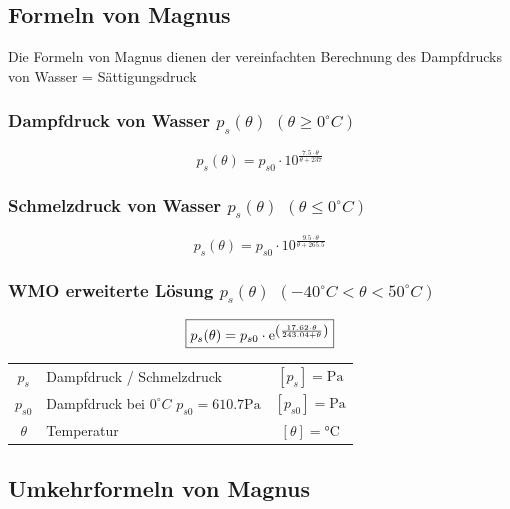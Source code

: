 


\subsection{Formeln von Magnus}
Die Formeln von Magnus dienen der vereinfachten Berechnung des Dampfdrucks von Wasser = Sättigungsdruck 

\subsubsection{Dampfdruck von Wasser $p_s(\theta)$ $(\theta \geq 0 ^{\circ}C)$}


$$ \boxed{ p_s(\theta) = p_{s0} \cdot 10^{ \frac{7.5 \cdot \theta}{\theta + 237}  } } $$



\subsubsection{Schmelzdruck von Wasser $p_s(\theta)$ $ (\theta \leq 0 ^{\circ}C)$}

$$ \boxed{ p_s(\theta) = p_{s0} \cdot 10^{ \frac{9.5 \cdot \theta}{\theta + 265.5} } } $$


\subsubsection{WMO erweiterte Lösung $p_s(\theta)$ $ (-40^{\circ}C < \theta < 50^{\circ}C) $}

$$ \boxed{p_s(\theta) = p_{s0} \cdot \mathrm{e} ^{\left( \frac{17.62 \cdot \theta}{243.04 + \theta} \right)} }$$



\begin{tabular}{c l c}
	$p_s$ & Dampfdruck / Schmelzdruck & $[p_s] = \mathrm{Pa}$ \\
	$p_{s0}$ & Dampfdruck bei $0^{\circ}C$ \quad $p_{s0} = 610.7 \mathrm{Pa} $ & $[p_{s0}] = \mathrm{Pa}$ \\
	$\theta$ & Temperatur & $[\theta] = \text{°C}$ \\
	
\end{tabular}




\subsection{Umkehrformeln von Magnus}

